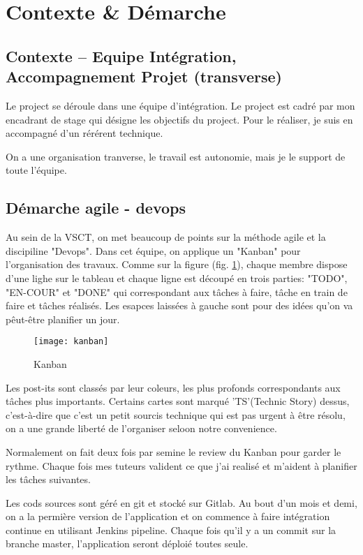 \section{Contexte \& Démarche}
\subsection{Contexte -- Equipe Intégration, Accompagnement Projet (transverse)}
Le project se déroule dans une équipe d'intégration. Le project est cadré par mon encadrant de stage qui désigne les objectifs du project. Pour le réaliser, je suis en accompagné d'un rérérent technique.

On a une organisation tranverse, le travail est autonomie, mais je le support de toute l'équipe.

\subsection{Démarche agile - devops}
Au sein de la VSCT, on met beaucoup de points sur la méthode agile et la discipiline "Devops". Dans cet équipe, on applique un "Kanban" pour l'organisation des travaux.  Comme sur la figure (fig. \ref{fig:kanban}), chaque membre dispose d'une lighe sur le tableau et chaque ligne est découpé en trois parties: "TODO", "EN-COUR" et "DONE" qui correspondant aux tâches à faire, tâche en train de faire et tâches réalisés. Les esapces laissées à gauche sont pour des idées qu'on va pêut-être planifier un jour.

\begin{figure}[h]
\centering
\texttt{[image: kanban]}
\caption{Kanban}
\label{fig:kanban}
\end{figure}

Les post-its sont classés par leur coleurs, les plus profonds correspondants aux tâches plus importants. Certains cartes sont marqué 'TS'(Technic Story) dessus, c'est-à-dire que c'est un petit sourcis technique qui est pas urgent à être résolu, on a une grande liberté de l'organiser seloon notre convenience.

Normalement on fait  deux fois par semine le review du Kanban pour garder le rythme. Chaque fois mes tuteurs valident ce que j'ai realisé et m'aident à planifier les tâches suivantes.

Les cods sources sont géré en git et stocké sur Gitlab. Au bout d'un mois et demi, on a la permière version de l'application et on commence à faire intégration continue en utilisant Jenkins pipeline. Chaque fois qu'il y a un commit sur la branche master, l'application seront déploié toutes seule.

\clearpage

